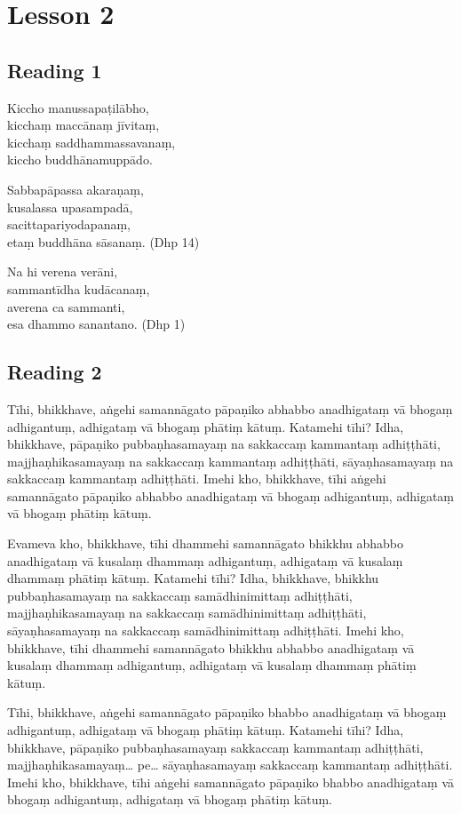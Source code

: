 \chapter{Lesson 2}

\section*{Reading 1}

Kiccho manussapaṭilābho,\\
kicchaṃ maccānaṃ jīvitaṃ,\\
kicchaṃ saddhammassavanaṃ,\\
kiccho buddhānamuppādo.

Sabbapāpassa akaraṇaṃ,\\
kusalassa upasampadā,\\
sacittapariyodapanaṃ,\\
etaṃ buddhāna sāsanaṃ. (Dhp 14)

Na hi verena verāni,\\
sammantīdha kudācanaṃ,\\
averena ca sammanti,\\
esa dhammo sanantano. (Dhp 1)

\section*{Reading 2}

Tīhi, bhikkhave, aṅgehi samannāgato pāpaṇiko abhabbo anadhigataṃ vā bhogaṃ adhigantuṃ, adhigataṃ vā bhogaṃ phātiṃ kātuṃ. Katamehi tīhi? Idha, bhikkhave, pāpaṇiko pubbaṇhasamayaṃ na sakkaccaṃ kammantaṃ adhiṭṭhāti, majjhaṇhikasamayaṃ na sakkaccaṃ kammantaṃ adhiṭṭhāti, sāyaṇhasamayaṃ na sakkaccaṃ kammantaṃ adhiṭṭhāti. Imehi kho, bhikkhave, tīhi aṅgehi samannāgato pāpaṇiko abhabbo anadhigataṃ vā bhogaṃ adhigantuṃ, adhigataṃ vā bhogaṃ phātiṃ kātuṃ.

Evameva kho, bhikkhave, tīhi dhammehi samannāgato bhikkhu abhabbo anadhigataṃ vā kusalaṃ dhammaṃ adhigantuṃ, adhigataṃ vā kusalaṃ dhammaṃ phātiṃ kātuṃ. Katamehi tīhi? Idha, bhikkhave, bhikkhu pubbaṇhasamayaṃ na sakkaccaṃ samādhinimittaṃ adhiṭṭhāti, majjhaṇhikasamayaṃ na sakkaccaṃ samādhinimittaṃ adhiṭṭhāti, sāyaṇhasamayaṃ na sakkaccaṃ samādhinimittaṃ adhiṭṭhāti. Imehi kho, bhikkhave, tīhi dhammehi samannāgato bhikkhu abhabbo anadhigataṃ vā kusalaṃ dhammaṃ adhigantuṃ, adhigataṃ vā kusalaṃ dhammaṃ phātiṃ kātuṃ.

Tīhi, bhikkhave, aṅgehi samannāgato pāpaṇiko bhabbo anadhigataṃ vā bhogaṃ adhigantuṃ, adhigataṃ vā bhogaṃ phātiṃ kātuṃ. Katamehi tīhi? Idha, bhikkhave, pāpaṇiko pubbaṇhasamayaṃ sakkaccaṃ kammantaṃ adhiṭṭhāti, majjhaṇhikasamayaṃ… pe… sāyaṇhasamayaṃ sakkaccaṃ kammantaṃ adhiṭṭhāti. Imehi kho, bhikkhave, tīhi aṅgehi samannāgato pāpaṇiko bhabbo anadhigataṃ vā bhogaṃ adhigantuṃ, adhigataṃ vā bhogaṃ phātiṃ kātuṃ.

